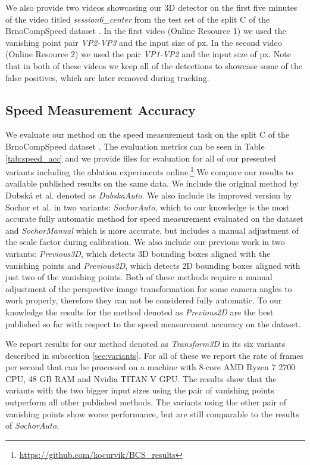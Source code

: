 \documentclass[twocolumn]{svjour3}          \smartqed  \usepackage{graphicx}
\begin{document}
We also provide two videos showcasing our 3D detector on the first five minutes of the video titled \textit{session6\_center} from the test set of the split C of the BrnoCompSpeed dataset \cite{brnocompspeed}. In the first video (Online Resource 1) we used the vanishing point pair \textit{VP2-VP3} and the input size of  px. In the second video (Online Resource 2) we used the pair \textit{VP1-VP2} and the input size of  px. Note that in both of these videos we keep all of the detections to showcase some of the false positives, which are later removed during tracking.

\subsection{Speed Measurement Accuracy}

We evaluate our method on the speed measurement task on the split C of the BrnoCompSpeed dataset \cite{brnocompspeed}. The evaluation metrics can be seen in Table \ref{tab:speed_acc} and we provide files for evaluation for all of our presented variants including the ablation experiments online.\footnote{\url{https://github.com/kocurvik/BCS_results}} We compare our results to available published results on the same data. We include the original method by Dubsk\'{a} et al. \cite{dubska2014} denoted as \textit{DubskaAuto}. We also include its improved version by Sochor et al. \cite{sochor2017} in two variants: \textit{SochorAuto}, which to our knowledge is the most accurate fully automatic method for speed measurement evaluated on the dataset and \textit{SochorManual} which is more accurate, but includes a manual adjustment of the scale factor during calibration. We also include our previous work \cite{CVWW2019} in two variants: \textit{Previous3D}, which detects 3D bounding boxes aligned with the vanishing points and \textit{Previous2D}, which detects 2D bounding boxes aligned with just two of the vanishing points. Both of these methods require a manual adjustment of the perspective image transformation for some camera angles to work properly, therefore they can not be considered fully automatic. To our knowledge the results for the method denoted as \textit{Previous2D} are the best published so far with respect to the speed measurement accuracy on the dataset.

We report results for our method denoted as \textit{Transform3D} in its six variants described in subsection \ref{sec:variants}. For all of these we report the rate of frames per second that can be processed on a machine with 8-core AMD Ryzen 7 2700 CPU, 48 GB RAM and Nvidia TITAN V GPU. The results show that the variants with the two bigger input sizes using the pair of vanishing points  outperform all other published methods. The variants using the other pair of vanishing points show worse performance, but are still comparable to the results of \textit{SochorAuto}.
\end{document}
